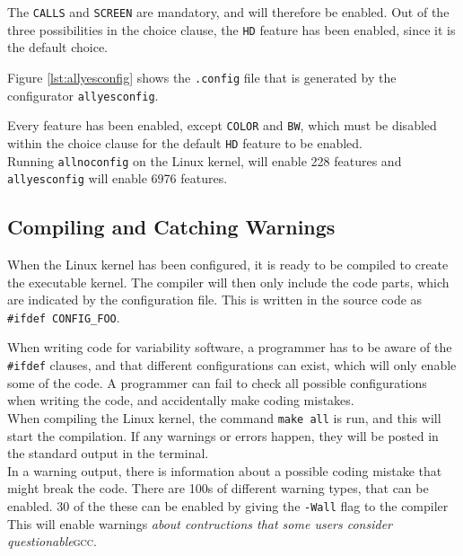 \documentclass[a4paper,11pt]{report}
\newcommand{\textcode}[1]{\fboxsep=1pt\texttt{\colorbox{gray!20}{#1}}}
\newcommand{\figa}{
    \begin{figure}[!htpb]
    \centering
}
\newcommand{\figb}[2]{
    \caption{#1}
    \label{#2}
    \end{figure}
}
\begin{document}
The \texttt{CALLS} and \texttt{SCREEN} are mandatory, and will 
therefore be enabled. Out of the three possibilities in the choice clause, the 
\texttt{HD} feature has been enabled, since it is the default choice.


\figa
    \subfigure[allnoconfig]{
        \label{lst:allnoconfig}
        
    }
    \qquad %
    \subfigure[allyesconfig]{
        \label{lst:allyesconfig}
        
    }
\figb{}{}


Figure \ref{lst:allyesconfig} shows the \texttt{.config} file that is generated by 
the configurator \texttt{allyesconfig}.

Every feature has been enabled, except \texttt{COLOR} and \texttt{BW}, which 
must be disabled within the choice clause for the default \texttt{HD} feature 
to be enabled.
\\

Running \texttt{allnoconfig} on the Linux kernel, will enable 228 features and 
\texttt{allyesconfig} will enable 6976 features.


            \subsection{Compiling and Catching Warnings}

When the Linux kernel has been configured, it is ready to be compiled to create 
the executable kernel. The compiler will then only include the code parts, 
which are indicated by the configuration file. This is written in the source 
code as \textcode{\#ifdef CONFIG\_FOO}.

When writing code for variability software, a programmer has to be aware of the 
\textcode{\#ifdef} clauses, and that different configurations can exist, which 
will only enable some of the code. A programmer can fail to check all possible 
configurations when writing the code, and accidentally make coding mistakes.
\\

When compiling the Linux kernel, the command \textcode{make all} is run, and 
this will start the compilation. If any warnings or errors happen, they will be 
posted in the standard output in the terminal.
\\

In a warning output, there is information about a possible coding mistake that 
might break the code. There are 100s of different warning types, that can be 
enabled. 30 of the these can be enabled by giving the \textcode{-Wall} flag 
to the compiler  This will enable warnings \emph{about contructions that some 
users consider questionable}\textsc{gcc}\cite{gccwarnings}.
\end{document}
